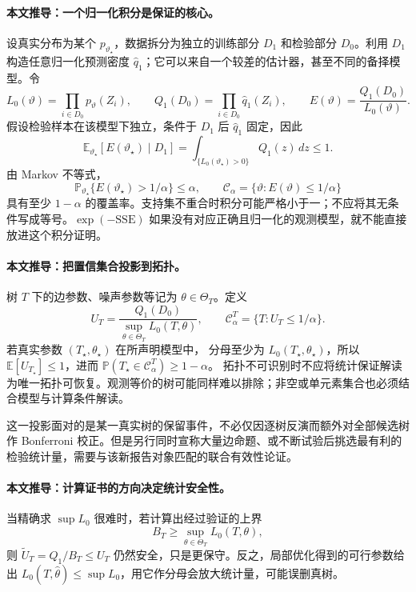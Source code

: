\documentclass[UTF8,11pt,fontset=fandol]{ctexart}
\theoremstyle{remark}
\numberwithin{equation}{section}
\begin{document}
\paragraph{本文推导：一个归一化积分是保证的核心。}
设真实分布为某个 $p_{\vartheta_\star}$，数据拆分为独立的训练部分 $D_1$ 和检验部分 $D_0$。利用 $D_1$ 构造任意归一化预测密度 $\widehat q_1$；它可以来自一个较差的估计器，甚至不同的备择模型。令
\[
 L_0(\vartheta)=\prod_{i\in D_0}p_\vartheta(Z_i),\qquad
 Q_1(D_0)=\prod_{i\in D_0}\widehat q_1(Z_i),\qquad
 E(\vartheta)=\frac{Q_1(D_0)}{L_0(\vartheta)}.
\]
假设检验样本在该模型下独立，条件于 $D_1$ 后 $\widehat q_1$ 固定，因此
\[
 \mathbb E_{\vartheta_\star}[E(\vartheta_\star)\mid D_1]
 =\int_{\{L_0(\vartheta_\star)>0\}}Q_1(z)\,dz\le1.
\]
由 Markov 不等式，
\[
 \mathbb P_{\vartheta_\star}\{E(\vartheta_\star)>1/\alpha\}\le\alpha,
 \qquad
 \mathcal C_\alpha=\{\vartheta:E(\vartheta)\le1/\alpha\}
\]
具有至少 $1-\alpha$ 的覆盖率。支持集不重合时积分可能严格小于一；不应将其无条件写成等号。$\exp(-\mathrm{SSE})$ 如果没有对应正确且归一化的观测模型，就不能直接放进这个积分证明。

\paragraph{本文推导：把置信集合投影到拓扑。}
树 $T$ 下的边参数、噪声参数等记为 $\theta\in\Theta_T$。定义
\[
 U_T=\frac{Q_1(D_0)}
 {\sup_{\theta\in\Theta_T}L_0(T,\theta)},\qquad
 \mathcal C^T_\alpha=\{T:U_T\le1/\alpha\}.
\]
若真实参数 $(T_\star,\theta_\star)$ 在所声明模型中，
分母至少为 $L_0(T_\star,\theta_\star)$，所以
$\mathbb E[U_{T_\star}]\le1$，进而
$\mathbb P(T_\star\in\mathcal C^T_\alpha)\ge1-\alpha$。
拓扑不可识别时不应将统计保证解读为唯一拓扑可恢复。观测等价的树可能同样难以排除；非空或单元素集合也必须结合模型与计算条件解读。

这一投影面对的是某一真实树的保留事件，不必仅因逐树反演而额外对全部候选树作 Bonferroni 校正。但是另行同时宣称大量边命题、或不断试验后挑选最有利的检验统计量，需要与该新报告对象匹配的联合有效性论证。

\paragraph{本文推导：计算证书的方向决定统计安全性。}
当精确求 $\sup L_0$ 很难时，若计算出经过验证的上界
\[
 B_T\ge\sup_{\theta\in\Theta_T}L_0(T,\theta),
\]
则 $\widetilde U_T=Q_1/B_T\le U_T$ 仍然安全，只是更保守。反之，局部优化得到的可行参数给出
$L_0(T,\widehat\theta)\le\sup L_0$，用它作分母会放大统计量，可能误删真树。
\end{document}

